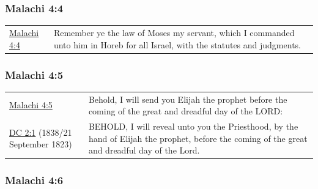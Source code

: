 		\subsubsection{Malachi 4:4}
		
			\begin{table}[H]
			\begin{tabular}{p{3cm}p{12cm}}
			\hyperref[MALACHI-4-4]{Malachi 4:4} & Remember ye the law of Moses my servant, which I commanded unto him in Horeb for all Israel, with the statutes and judgments.
			\end{tabular}
			\end{table}
			
		\subsubsection{Malachi 4:5}
		
			\begin{table}[H]
			\begin{tabular}{p{3cm}p{12cm}}
			\hyperref[MALACHI-4-5]{Malachi 4:5} & Behold, I will send you Elijah the prophet before the coming of the great and dreadful day of the LORD: \\
			\hyperref[DC2-1]{DC 2:1} (1838/21 September 1823) & BEHOLD, I will reveal unto you the Priesthood, by the hand of Elijah the prophet, before the coming of the great and dreadful day of the Lord. \\
			\end{tabular}
			\end{table}
			
		\subsubsection{Malachi 4:6}
		
